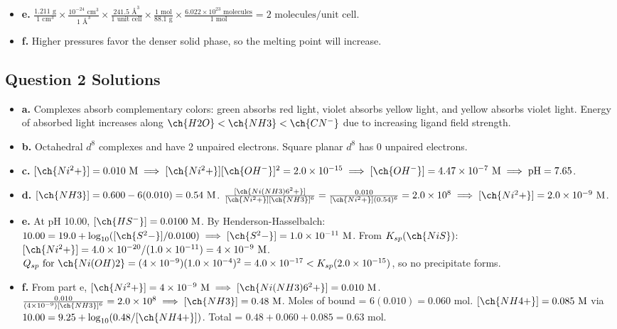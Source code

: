 \documentclass[11pt,letterpaper]{article}
\begin{document}
\begin{itemize}[leftmargin=*]
    \item \textbf{e.} 
    $\frac{1.211\text{ g}}{1\text{ cm}^3} \times \frac{10^{-24}\text{ cm}^3}{1\text{ \AA}^3} \times \frac{241.5\text{ \AA}^3}{1\text{ unit cell}} \times \frac{1\text{ mol}}{88.1\text{ g}} \times \frac{6.022\times10^{23}\text{ molecules}}{1\text{ mol}} = 2\text{ molecules/unit cell}$.
    
    \item \textbf{f.} 
    Higher pressures favor the denser solid phase, so the melting point will increase.
\end{itemize}

\subsection*{Question 2 Solutions}
\begin{itemize}[leftmargin=*]
    \item \textbf{a.} Complexes absorb complementary colors: green  absorbs red light, violet  absorbs yellow light, and yellow  absorbs violet light. Energy of absorbed light increases along $\ch{H2O} < \ch{NH3} < \ch{CN^-}$ due to increasing ligand field strength.
    \item \textbf{b.} Octahedral $d^8$ complexes  and  have 2 unpaired electrons. Square planar $d^8$  has 0 unpaired electrons.
    \item \textbf{c.} $[\ch{Ni^2+}] = 0.010\text{ M} \implies [\ch{Ni^2+}][\ch{OH^-}]^2 = 2.0\times 10^{-15} \implies [\ch{OH^-}] = 4.47\times 10^{-7}\text{ M} \implies \text{pH} = 7.65$.
    \item \textbf{d.} $[\ch{NH3}] = 0.600 - 6(0.010) = 0.54\text{ M}$. $\frac{[\ch{Ni(NH3)6^2+}]}{[\ch{Ni^2+}][\ch{NH3}]^6} = \frac{0.010}{[\ch{Ni^2+}](0.54)^6} = 2.0\times 10^8 \implies [\ch{Ni^2+}] = 2.0 \times 10^{-9}\text{ M}$.
    \item \textbf{e.} At pH 10.00, $[\ch{HS^-}] = 0.0100\text{ M}$. By Henderson-Hasselbalch: $10.00 = 19.0 + \log_{10}([\ch{S^2-}]/0.0100) \implies [\ch{S^2-}] = 1.0\times 10^{-11}\text{ M}$. From $K_{sp}(\ch{NiS})$: $[\ch{Ni^2+}] = 4.0\times 10^{-20}/(1.0\times 10^{-11}) = 4\times 10^{-9}\text{ M}$. $Q_{sp}\text{ for }\ch{Ni(OH)2} = (4\times 10^{-9})(1.0\times 10^{-4})^2 = 4.0\times 10^{-17} < K_{sp} (2.0\times 10^{-15})$, so no precipitate forms.
    \item \textbf{f.} From part e, $[\ch{Ni^2+}] = 4\times 10^{-9}\text{ M} \implies [\ch{Ni(NH3)6^2+}] = 0.010\text{ M}$. $\frac{0.010}{(4\times 10^{-9})[\ch{NH3}]^6} = 2.0\times 10^8 \implies [\ch{NH3}] = 0.48\text{ M}$. Moles of bound  = $6(0.010) = 0.060\text{ mol}$. $[\ch{NH4+}] = 0.085\text{ M}$ via $10.00 = 9.25 + \log_{10}(0.48/[\ch{NH4+}])$. Total  = $0.48 + 0.060 + 0.085 = 0.63\text{ mol}$.
\end{itemize}
\end{document}
